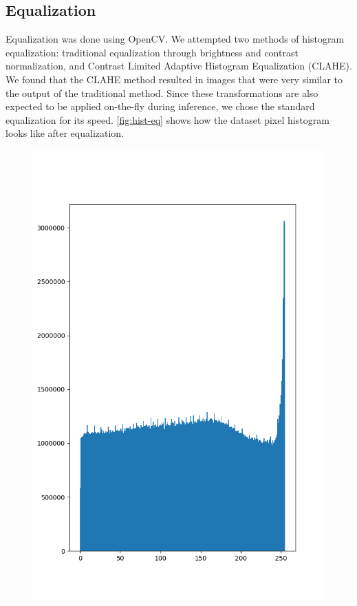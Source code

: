 \subsection{Equalization}

Equalization was done using OpenCV. We attempted two methods of histogram equalization: traditional
equalization through brightness and contrast normalization, and Contrast Limited Adaptive Histogram
Equalization (CLAHE). We found that the CLAHE method resulted in images that were very similar to
the output of the traditional method. Since these transformations are also expected to be applied
on-the-fly during inference, we chose the standard equalization for its speed.
\autoref{fig:hist-eq} shows how the dataset pixel histogram looks like after equalization.

\begin{figure}[h]
  \includegraphics[scale=0.3]{imgs/hist_8_eq.png}

\end{figure}
